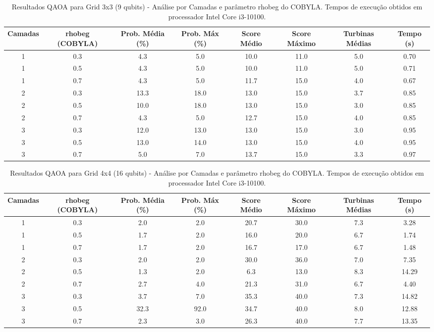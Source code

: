 \documentclass{weciq}
\begin{document}
\begin{table}[htbp]
\centering
\caption{Resultados QAOA para Grid 3x3 (9 qubits) - Análise por Camadas e parâmetro rhobeg do COBYLA. Tempos de execução obtidos em processador Intel Core i3-10100.}
\label{tab:resultados_3_3}
\footnotesize
\begin{tabular}{|c|c|c|c|c|c|c|c|}
\hline
\textbf{Camadas} & \textbf{rhobeg (COBYLA)} & \textbf{Prob. Média (\%)} & \textbf{Prob. Máx (\%)} & \textbf{Score Médio} & \textbf{Score Máximo} & \textbf{Turbinas Médias} & \textbf{Tempo (s)} \\
\hline
1 & 0.3 & 4.3 & 5.0 & 10.0 & 11.0 & 5.0 & 0.70 \\
1 & 0.5 & 4.3 & 5.0 & 10.0 & 11.0 & 5.0 & 0.71 \\
1 & 0.7 & 4.3 & 5.0 & 11.7 & 15.0 & 4.0 & 0.67 \\
2 & 0.3 & 13.3 & 18.0 & 13.0 & 15.0 & 3.7 & 0.85 \\
2 & 0.5 & 10.0 & 18.0 & 13.0 & 15.0 & 3.0 & 0.85 \\
2 & 0.7 & 4.3 & 5.0 & 12.7 & 15.0 & 4.0 & 0.85 \\
3 & 0.3 & 12.0 & 13.0 & 13.0 & 15.0 & 3.0 & 0.95 \\
3 & 0.5 & 13.0 & 14.0 & 13.0 & 15.0 & 4.0 & 0.95 \\
3 & 0.7 & 5.0 & 7.0 & 13.7 & 15.0 & 3.3 & 0.97 \\
\hline
\end{tabular}
\end{table}

\begin{table}[htbp]
\centering
\caption{Resultados QAOA para Grid 4x4 (16 qubits) - Análise por Camadas e parâmetro rhobeg do COBYLA. Tempos de execução obtidos em processador Intel Core i3-10100.}
\label{tab:resultados_4_4}
\footnotesize
\begin{tabular}{|c|c|c|c|c|c|c|c|}
\hline
\textbf{Camadas} & \textbf{rhobeg (COBYLA)} & \textbf{Prob. Média (\%)} & \textbf{Prob. Máx (\%)} & \textbf{Score Médio} & \textbf{Score Máximo} & \textbf{Turbinas Médias} & \textbf{Tempo (s)} \\
\hline
1 & 0.3 & 2.0 & 2.0 & 20.7 & 30.0 & 7.3 & 3.28 \\
1 & 0.5 & 1.7 & 2.0 & 16.0 & 20.0 & 6.7 & 1.74 \\
1 & 0.7 & 1.7 & 2.0 & 16.7 & 17.0 & 6.7 & 1.48 \\
2 & 0.3 & 2.0 & 2.0 & 30.0 & 36.0 & 7.0 & 7.35 \\
2 & 0.5 & 1.3 & 2.0 & 6.3 & 13.0 & 8.3 & 14.29 \\
2 & 0.7 & 2.7 & 4.0 & 21.3 & 31.0 & 6.7 & 4.40 \\
3 & 0.3 & 3.7 & 7.0 & 35.3 & 40.0 & 7.3 & 14.82 \\
3 & 0.5 & 32.3 & 92.0 & 34.7 & 40.0 & 8.0 & 12.88 \\
3 & 0.7 & 2.3 & 3.0 & 26.3 & 40.0 & 7.7 & 13.35 \\
\hline
\end{tabular}
\end{table}
\end{document}
